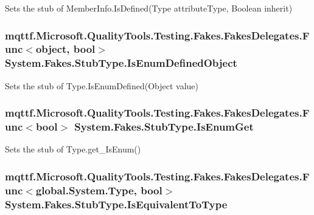 Sets the stub of Member\-Info.\-Is\-Defined(\-Type attribute\-Type, Boolean inherit)

\hypertarget{class_system_1_1_fakes_1_1_stub_type_a91aaa0300476e10198747e80250f04f7}{
\subsubsection[{Is\-Enum\-Defined\-Object}]{\setlength{\rightskip}{0pt plus 5cm}mqttf.\-Microsoft.\-Quality\-Tools.\-Testing.\-Fakes.\-Fakes\-Delegates.\-Func$<$object, bool$>$ System.\-Fakes.\-Stub\-Type.\-Is\-Enum\-Defined\-Object}}\label{class_system_1_1_fakes_1_1_stub_type_a91aaa0300476e10198747e80250f04f7}


Sets the stub of Type.\-Is\-Enum\-Defined(\-Object value)

\hypertarget{class_system_1_1_fakes_1_1_stub_type_a3b5ebd0187a6ef22a854d7366ab4cb9f}{
\subsubsection[{Is\-Enum\-Get}]{\setlength{\rightskip}{0pt plus 5cm}mqttf.\-Microsoft.\-Quality\-Tools.\-Testing.\-Fakes.\-Fakes\-Delegates.\-Func$<$bool$>$ System.\-Fakes.\-Stub\-Type.\-Is\-Enum\-Get}}\label{class_system_1_1_fakes_1_1_stub_type_a3b5ebd0187a6ef22a854d7366ab4cb9f}


Sets the stub of Type.\-get\-\_\-\-Is\-Enum()

\hypertarget{class_system_1_1_fakes_1_1_stub_type_a42a04b8fc401d580628b74455546fa9d}{
\subsubsection[{Is\-Equivalent\-To\-Type}]{\setlength{\rightskip}{0pt plus 5cm}mqttf.\-Microsoft.\-Quality\-Tools.\-Testing.\-Fakes.\-Fakes\-Delegates.\-Func$<$global.\-System.\-Type, bool$>$ System.\-Fakes.\-Stub\-Type.\-Is\-Equivalent\-To\-Type}}\label{class_system_1_1_fakes_1_1_stub_type_a42a04b8fc401d580628b74455546fa9d}


